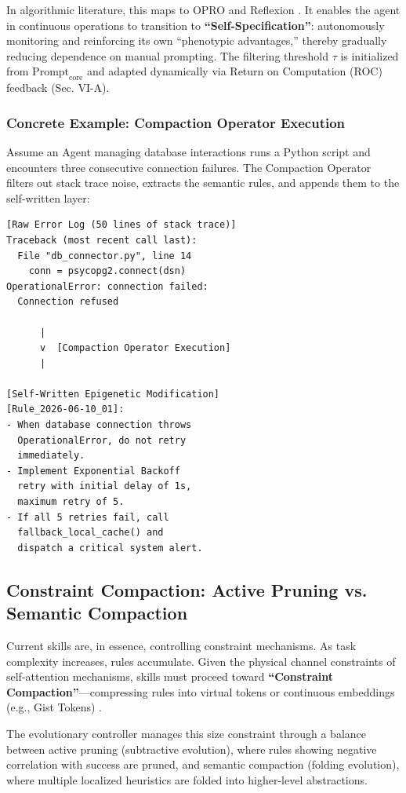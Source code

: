 \documentclass[10pt,journal,compsoc]{IEEEtran}
\begin{document}
In algorithmic literature, this maps to OPRO \cite{yang2023} and Reflexion \cite{shinn2023}. It enables the agent in continuous operations to transition to \textbf{``Self-Specification''}: autonomously monitoring and reinforcing its own ``phenotypic advantages,'' thereby gradually reducing dependence on manual prompting. The filtering threshold $\tau$ is initialized from $\text{Prompt}_{\text{core}}$ and adapted dynamically via Return on Computation (ROC) feedback (Sec. VI-A).

\subsubsection{Concrete Example: Compaction Operator Execution}
Assume an Agent managing database interactions runs a Python script and encounters three consecutive connection failures. The Compaction Operator filters out stack trace noise, extracts the semantic rules, and appends them to the self-written layer:

{\scriptsize
\begin{verbatim}
[Raw Error Log (50 lines of stack trace)]
Traceback (most recent call last):
  File "db_connector.py", line 14
    conn = psycopg2.connect(dsn)
OperationalError: connection failed:
  Connection refused

      |
      v  [Compaction Operator Execution]
      |

[Self-Written Epigenetic Modification]
[Rule_2026-06-10_01]:
- When database connection throws
  OperationalError, do not retry
  immediately.
- Implement Exponential Backoff
  retry with initial delay of 1s,
  maximum retry of 5.
- If all 5 retries fail, call
  fallback_local_cache() and
  dispatch a critical system alert.
\end{verbatim}
}

\subsection{Constraint Compaction: Active Pruning vs. Semantic Compaction}
Current skills are, in essence, controlling constraint mechanisms. As task complexity increases, rules accumulate. Given the physical channel constraints of self-attention mechanisms, skills must proceed toward \textbf{``Constraint Compaction''}---compressing rules into virtual tokens or continuous embeddings (e.g., Gist Tokens) \cite{mu2023}. 

The evolutionary controller manages this size constraint through a balance between active pruning (subtractive evolution), where rules showing negative correlation with success are pruned, and semantic compaction (folding evolution), where multiple localized heuristics are folded into higher-level abstractions.
\end{document}
